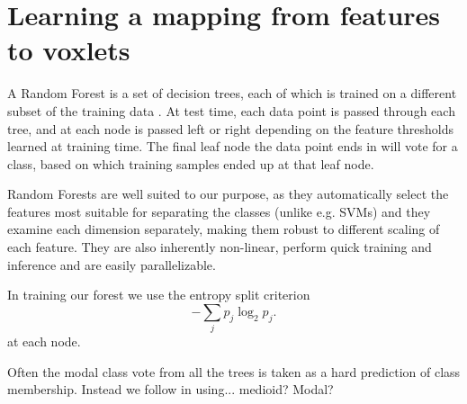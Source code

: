 \documentclass[10pt,twocolumn,letterpaper]{article}
\makeatletter
\renewcommand*{\eg}{e.g.\@\xspace}
\newcommand{\point}{\mathbf{p}}
\makeatother
\begin{document}


\section{Learning a mapping from features to voxlets}


A Random Forest is a set of decision trees, each of which is trained on a different subset of the training data \cite{breiman-ml-2001}.
At test time, each data point is passed through each tree, and at each node is passed left or right depending on the feature thresholds learned at training time. The final leaf node the data point ends in will vote for a class, based on which training samples ended up at that leaf node.

Random Forests are well suited to our purpose, as they automatically select the features most suitable for separating the classes (unlike \eg SVMs) and they examine each dimension separately, making them robust to different scaling of each feature. They are also inherently non-linear, perform quick training and inference and are easily parallelizable.


In training our forest we use the entropy split criterion
\begin{equation}
- \sum_j p_j \log_2 p_j.
\end{equation}
at each node.

Often the modal class vote from all the trees is taken as a hard prediction of class membership. Instead we follow \cite{} in using... medioid? Modal?
\end{document}
